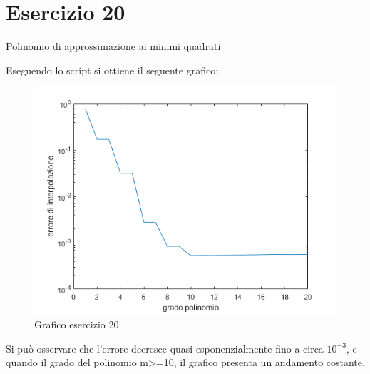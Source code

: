 \section{Esercizio 20}
Polinomio di approssimazione ai minimi quadrati

Eseguendo lo script si ottiene il seguente grafico:
\begin{figure}[h!]
    \includegraphics[scale=0.8]{CodiceMatlab/Esercizio20/graficoEs20.png}
    \caption{Grafico esercizio 20}
    \label{fig:es20}    
\end{figure}

Si può osservare  che l'errore decresce quasi esponenzialmente fino a circa $10^{-3}$, e quando il grado del polinomio m>=10, il grafico presenta un andamento costante.